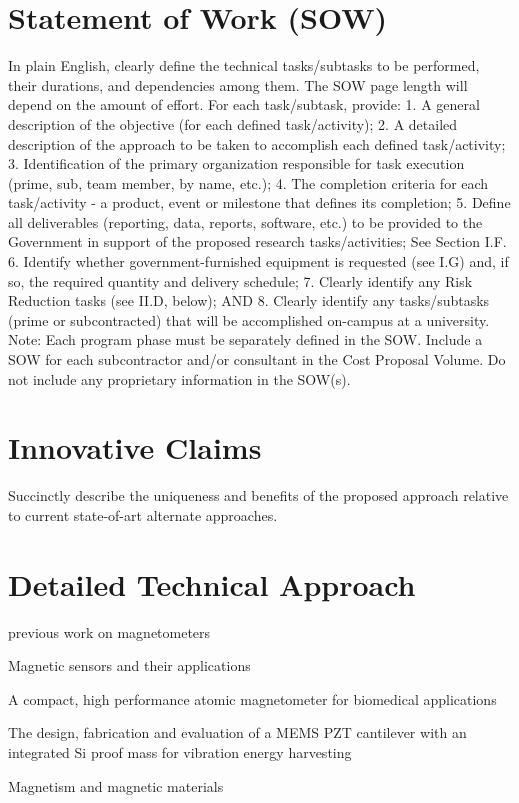 
\section{Statement of Work (SOW)}
In plain English, clearly define the technical tasks/subtasks to be performed, their durations,
and dependencies among them. The SOW page length will depend on the amount of effort.
For each task/subtask, provide:
1. A general description of the objective (for each defined task/activity);
2. A detailed description of the approach to be taken to accomplish each defined
task/activity;
3. Identification of the primary organization responsible for task execution (prime,
sub, team member, by name, etc.);
4. The completion criteria for each task/activity - a product, event or milestone that
defines its completion;
5. Define all deliverables (reporting, data, reports, software, etc.) to be provided to
the Government in support of the proposed research tasks/activities; See Section
I.F.
6. Identify whether government-furnished equipment is requested (see I.G) and, if
so, the required quantity and delivery schedule;
7. Clearly identify any Risk Reduction tasks (see II.D, below); AND
8. Clearly identify any tasks/subtasks (prime or subcontracted) that will be
accomplished on-campus at a university.
Note: Each program phase must be separately defined in the SOW. Include a SOW for each
subcontractor and/or consultant in the Cost Proposal Volume. Do not include any proprietary
information in the SOW(s).
\section{Innovative Claims}
Succinctly describe the uniqueness and benefits of the proposed approach relative to current
state-of-art alternate approaches.
\section{Detailed Technical Approach}
previous work on magnetometers

\cite{lenz2006magnetic} Magnetic sensors and their applications

\cite{shah2013compact} A compact, high performance atomic magnetometer for biomedical applications

\cite{shen2008design} The design, fabrication and evaluation of a MEMS PZT cantilever with an integrated Si proof mass for vibration energy harvesting

\cite{coey2010magnetism} Magnetism and magnetic materials

